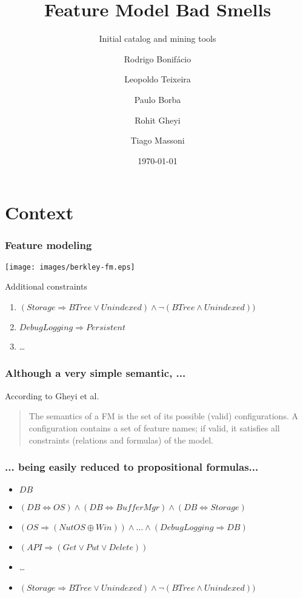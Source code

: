\documentclass{beamer}
\title{Feature Model Bad Smells}
\subtitle{Initial catalog and mining tools}
\author{Rodrigo Bonif\'{a}cio \and Leopoldo Teixeira \and Paulo Borba \\ \and Rohit Gheyi \and Tiago Massoni}
\date{\today}
\begin{document}
\frame{\titlepage}

\section{Context}

\begin{frame}
  \frametitle{Feature modeling}
  
\begin{center}
  \texttt{[image: images/berkley-fm.eps]} %
\end{center}

\begin{small} 

Additional constraints

\begin{enumerate}
 \item  $(Storage \Rightarrow BTree \lor Unindexed) \land \lnot(BTree \land Unindexed)) $
 \item $DebugLogging \Rightarrow Persistent$
 \item \ldots
\end{enumerate}

\end{small}

\end{frame}

\begin{frame}

\frametitle{Although a very simple semantic, ...}

According to Gheyi et al.

\begin{quote}
The semantics of a FM is the set of its possible (valid) configurations. 
A configuration contains a set of feature names; if valid, it satisfies all
constraints (relations and formulas) of the model.
\end{quote}

\end{frame}

\begin{frame}

\frametitle{... being easily reduced to propositional formulas...}

\begin{small}
\begin{itemize}
 \item $DB$ 
 \item $(DB \Leftrightarrow OS) \land (DB \Leftrightarrow BufferMgr) \land (DB \Leftrightarrow Storage)$
 \item $(OS \Rightarrow (NutOS \oplus Win)) \land \ldots \land (DebugLogging \Rightarrow DB)$ 
 \item $(API \Rightarrow (Get \lor Put \lor Delete))$
 \item \ldots
 \item $(Storage \Rightarrow BTree \lor Unindexed) \land \lnot(BTree \land Unindexed)) $
\end{itemize}
\end{small}

\end{frame}
\end{document}
